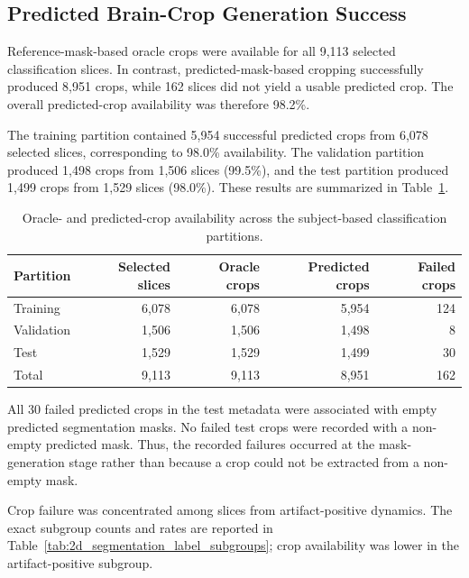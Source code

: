 \subsection{Predicted Brain-Crop Generation Success}
\label{subsec:results_crop_success}

Reference-mask-based oracle crops were available for all 9,113 selected classification slices. In contrast, predicted-mask-based cropping successfully produced 8,951 crops, while 162 slices did not yield a usable predicted crop. The overall predicted-crop availability was therefore 98.2\%.

The training partition contained 5,954 successful predicted crops from 6,078 selected slices, corresponding to 98.0\% availability. The validation partition produced 1,498 crops from 1,506 slices (99.5\%), and the test partition produced 1,499 crops from 1,529 slices (98.0\%). These results are summarized in Table~\ref{tab:roi_crop_availability}.

\begin{table}[htbp]
\centering
\caption{Oracle- and predicted-crop availability across the subject-based classification partitions.}
\label{tab:roi_crop_availability}
\begin{tabular}{lrrrr}
\hline
Partition & Selected slices & Oracle crops & Predicted crops & Failed crops \\
\hline
Training & 6,078 & 6,078 & 5,954 & 124 \\
Validation & 1,506 & 1,506 & 1,498 & 8 \\
Test & 1,529 & 1,529 & 1,499 & 30 \\
\hline
Total & 9,113 & 9,113 & 8,951 & 162 \\
\hline
\end{tabular}
\end{table}

All 30 failed predicted crops in the test metadata were associated with empty predicted segmentation masks. No failed test crops were recorded with a non-empty predicted mask. Thus, the recorded failures occurred at the mask-generation stage rather than because a crop could not be extracted from a non-empty mask.

Crop failure was concentrated among slices from artifact-positive dynamics. The exact subgroup counts and rates are reported in Table~\ref{tab:2d_segmentation_label_subgroups}; crop availability was lower in the artifact-positive subgroup.

